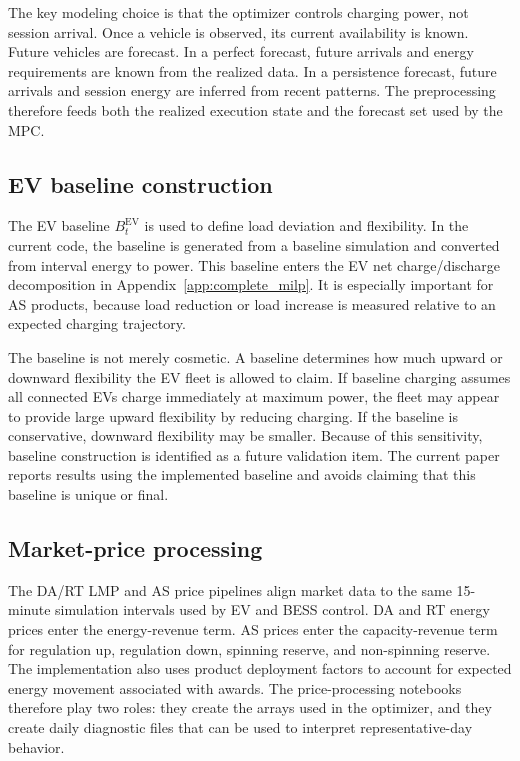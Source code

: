 \documentclass[final,5p,times]{elsarticle}
\newcommand{\EV}{\mathrm{EV}}
\begin{document}
The key modeling choice is that the optimizer controls charging power, not session arrival. Once a vehicle is observed, its current availability is known. Future vehicles are forecast. In a perfect forecast, future arrivals and energy requirements are known from the realized data. In a persistence forecast, future arrivals and session energy are inferred from recent patterns. The preprocessing therefore feeds both the realized execution state and the forecast set used by the MPC.

\subsection{EV baseline construction}
The EV baseline $B_t^{\EV}$ is used to define load deviation and flexibility. In the current code, the baseline is generated from a baseline simulation and converted from interval energy to power. This baseline enters the EV net charge/discharge decomposition in Appendix~\ref{app:complete_milp}. It is especially important for AS products, because load reduction or load increase is measured relative to an expected charging trajectory.

The baseline is not merely cosmetic. A baseline determines how much upward or downward flexibility the EV fleet is allowed to claim. If baseline charging assumes all connected EVs charge immediately at maximum power, the fleet may appear to provide large upward flexibility by reducing charging. If the baseline is conservative, downward flexibility may be smaller. Because of this sensitivity, baseline construction is identified as a future validation item. The current paper reports results using the implemented baseline and avoids claiming that this baseline is unique or final.

\subsection{Market-price processing}
The DA/RT LMP and AS price pipelines align market data to the same 15-minute simulation intervals used by EV and BESS control. DA and RT energy prices enter the energy-revenue term. AS prices enter the capacity-revenue term for regulation up, regulation down, spinning reserve, and non-spinning reserve. The implementation also uses product deployment factors to account for expected energy movement associated with awards. The price-processing notebooks therefore play two roles: they create the arrays used in the optimizer, and they create daily diagnostic files that can be used to interpret representative-day behavior.
\end{document}
